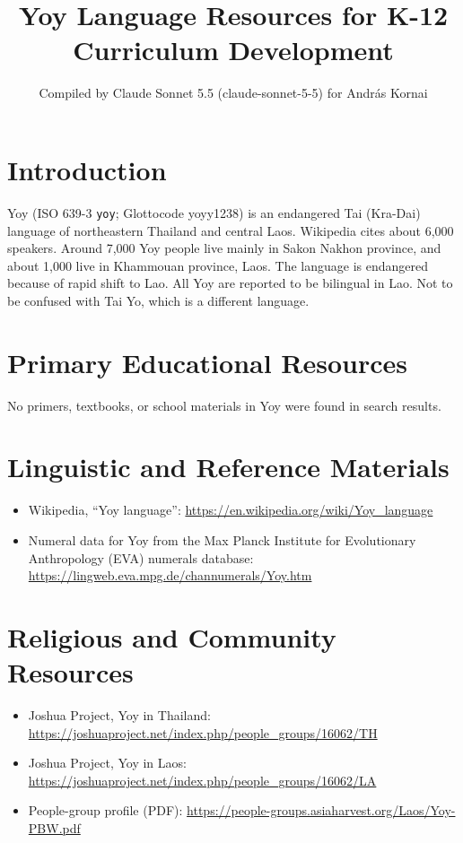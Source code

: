 \documentclass[12pt]{article}
\title{Yoy Language Resources for K-12 Curriculum Development}
\author{Compiled by Claude Sonnet 5.5 (claude-sonnet-5-5) for Andr\'as Kornai}
\date{}
\begin{document}
\maketitle

\section{Introduction}
Yoy (ISO 639-3 \texttt{yoy}; Glottocode yoyy1238) is an endangered Tai (Kra-Dai) language of northeastern Thailand and central Laos. Wikipedia cites about 6,000 speakers. Around 7,000 Yoy people live mainly in Sakon Nakhon province, and about 1,000 live in Khammouan province, Laos. The language is endangered because of rapid shift to Lao. All Yoy are reported to be bilingual in Lao. Not to be confused with Tai Yo, which is a different language.

\section{Primary Educational Resources}
No primers, textbooks, or school materials in Yoy were found in search results.

\section{Linguistic and Reference Materials}
\begin{itemize}
\item Wikipedia, ``Yoy language'': \url{https://en.wikipedia.org/wiki/Yoy_language}
\item Numeral data for Yoy from the Max Planck Institute for Evolutionary Anthropology (EVA) numerals database: \url{https://lingweb.eva.mpg.de/channumerals/Yoy.htm}
\end{itemize}

\section{Religious and Community Resources}
\begin{itemize}
\item Joshua Project, Yoy in Thailand: \url{https://joshuaproject.net/index.php/people_groups/16062/TH}
\item Joshua Project, Yoy in Laos: \url{https://joshuaproject.net/index.php/people_groups/16062/LA}
\item People-group profile (PDF): \url{https://people-groups.asiaharvest.org/Laos/Yoy-PBW.pdf}
\end{itemize}
\end{document}
